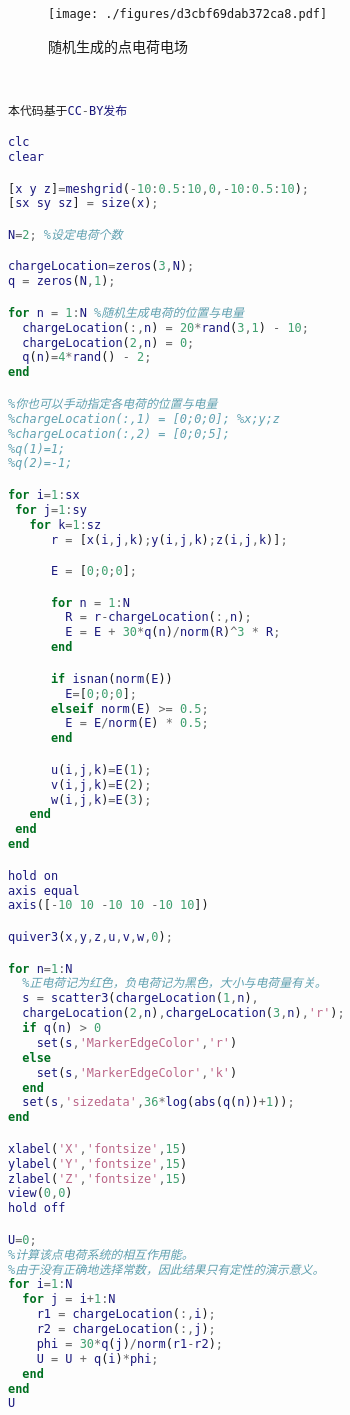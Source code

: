 

\begin{figure}[ht]
\centering
\texttt{[image: ./figures/d3cbf69dab372ca8.pdf]}
\caption{随机生成的点电荷电场} \label{fig_MLTEPD_1}
\end{figure}
\begin{lstlisting}[language=matlab]


本代码基于CC-BY发布

clc
clear

[x y z]=meshgrid(-10:0.5:10,0,-10:0.5:10);
[sx sy sz] = size(x);

N=2; %设定电荷个数

chargeLocation=zeros(3,N);
q = zeros(N,1);

for n = 1:N %随机生成电荷的位置与电量
  chargeLocation(:,n) = 20*rand(3,1) - 10;
  chargeLocation(2,n) = 0;
  q(n)=4*rand() - 2;
end

%你也可以手动指定各电荷的位置与电量
%chargeLocation(:,1) = [0;0;0]; %x;y;z
%chargeLocation(:,2) = [0;0;5];
%q(1)=1;
%q(2)=-1;

for i=1:sx
 for j=1:sy
   for k=1:sz
      r = [x(i,j,k);y(i,j,k);z(i,j,k)];

      E = [0;0;0];

      for n = 1:N
        R = r-chargeLocation(:,n);
        E = E + 30*q(n)/norm(R)^3 * R;
      end

      if isnan(norm(E))
        E=[0;0;0];
      elseif norm(E) >= 0.5;
        E = E/norm(E) * 0.5;
      end

      u(i,j,k)=E(1);
      v(i,j,k)=E(2);
      w(i,j,k)=E(3);
   end
 end
end

hold on
axis equal
axis([-10 10 -10 10 -10 10])

quiver3(x,y,z,u,v,w,0);

for n=1:N
  %正电荷记为红色，负电荷记为黑色，大小与电荷量有关。
  s = scatter3(chargeLocation(1,n),
  chargeLocation(2,n),chargeLocation(3,n),'r');
  if q(n) > 0 
    set(s,'MarkerEdgeColor','r')
  else
    set(s,'MarkerEdgeColor','k')
  end
  set(s,'sizedata',36*log(abs(q(n))+1));
end

xlabel('X','fontsize',15)
ylabel('Y','fontsize',15)
zlabel('Z','fontsize',15)
view(0,0)
hold off

U=0; 
%计算该点电荷系统的相互作用能。
%由于没有正确地选择常数，因此结果只有定性的演示意义。
for i=1:N
  for j = i+1:N
    r1 = chargeLocation(:,i);
    r2 = chargeLocation(:,j);
    phi = 30*q(j)/norm(r1-r2);
    U = U + q(i)*phi;
  end
end
U
\end{lstlisting}
